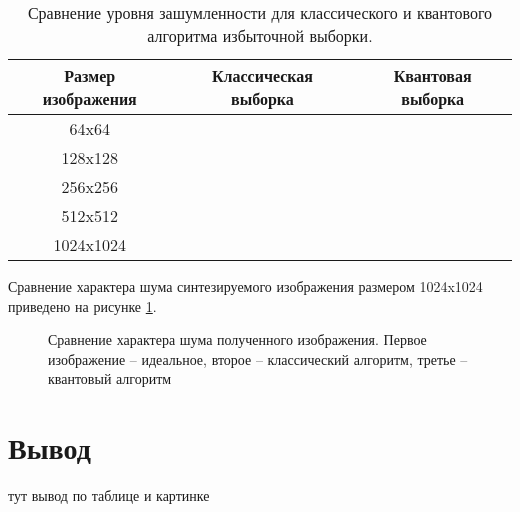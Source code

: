 \begin{table}[h!]
	\label{tab:noise}
	\caption{Сравнение уровня зашумленности для классического и квантового алгоритма избыточной выборки.}
	\begin{center}
		\begin{tabular}{|c c c|} 
			\hline
			Размер изображения & Классическая выборка & Квантовая выборка \\  
			\hline
			64x64 &  &   \\
			\hline
			128x128 &  &  \\
			\hline
			256x256 &  &   \\
			\hline
			512x512 &  & \\
			\hline
			1024x1024 &   & \\
			\hline
		\end{tabular}
	\end{center}
\end{table}

Сравнение характера шума синтезируемого изображения размером 1024x1024 приведено на рисунке \ref{img:noise}.

\begin{figure}[h!]
	\begin{center}
	\end{center}
	\captionsetup{justification=centering}
	\caption{Сравнение характера шума полученного изображения. Первое изображение -- идеальное, второе -- классический алгоритм, третье -- квантовый алгоритм}
	\label{img:noise}
\end{figure}


\section*{Вывод}

тут вывод по таблице и картинке